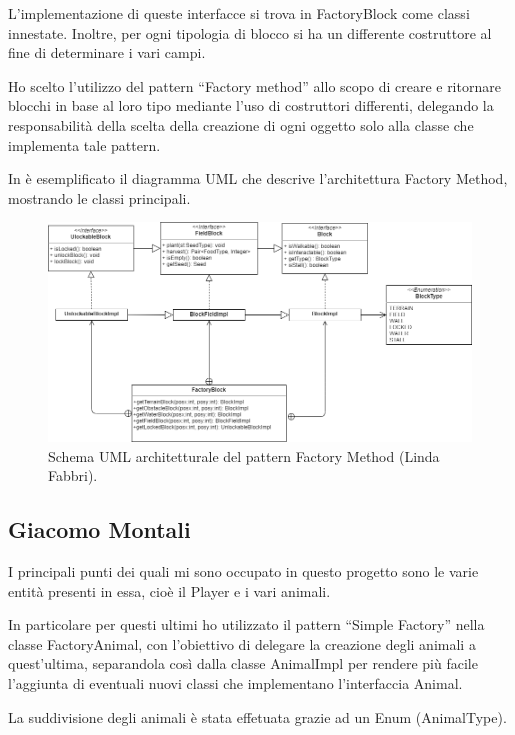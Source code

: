 \documentclass[a4paper,12pt]{report}
\begin{document}
L’implementazione di queste interfacce si trova in FactoryBlock come classi innestate. Inoltre, per ogni tipologia di blocco si ha un differente costruttore al fine di determinare i vari campi. 

Ho scelto l’utilizzo del pattern “Factory method” allo scopo di creare e ritornare blocchi in base al loro tipo mediante l’uso di costruttori differenti, delegando la responsabilità della scelta della creazione di ogni oggetto solo alla classe che implementa tale pattern.

In  è esemplificato il diagramma UML che descrive l'architettura Factory Method, mostrando le classi principali.

\hfill\break
\begin{figure}[!htb]
	\centerline{\includegraphics[scale=.5]{img/UML_FactoryLinda.png}}	
	\caption{Schema UML architetturale del pattern Factory Method (Linda Fabbri).}
	\label{img:LindaFabbri_Factory}
\end{figure}

\subsection{Giacomo Montali}

I principali punti dei quali mi sono occupato in questo progetto sono le varie entità presenti in essa, cioè il Player e i vari animali. 

In particolare per questi ultimi ho utilizzato il pattern “Simple Factory”  nella classe FactoryAnimal, con l’obiettivo di delegare la creazione degli animali a quest’ultima, separandola così dalla classe AnimalImpl per  rendere più facile l'aggiunta di eventuali nuovi classi che implementano l'interfaccia Animal. 

La suddivisione degli animali è stata effetuata grazie ad un Enum (AnimalType).
\end{document}
